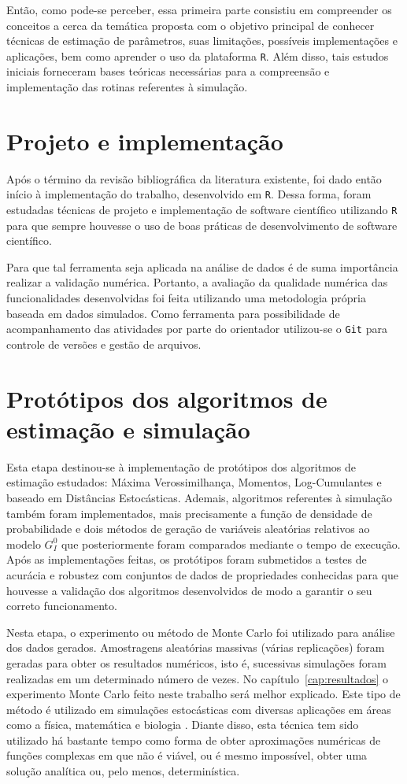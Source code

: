 Então, como pode-se perceber, essa primeira parte consistiu em compreender os conceitos a cerca da temática proposta com o objetivo principal de conhecer técnicas de estimação de parâmetros, suas limitações, possíveis implementações e aplicações, bem como aprender o uso da plataforma \texttt{R}. Além disso, tais estudos iniciais forneceram bases teóricas necessárias para a compreensão e implementação das rotinas referentes à simulação.

\section{Projeto e implementação}

Após o término da revisão bibliográfica da literatura existente, foi dado então início à implementação do trabalho, desenvolvido em \texttt{R}. Dessa forma, foram estudadas técnicas de projeto e implementação de software científico utilizando \texttt{R} para que sempre houvesse o uso de boas práticas de desenvolvimento de software científico.

Para que tal ferramenta seja aplicada na análise de dados é de suma importância realizar a validação numérica. Portanto, a avaliação da qualidade numérica das funcionalidades desenvolvidas foi feita utilizando uma metodologia própria baseada em dados simulados. Como ferramenta para possibilidade de acompanhamento das atividades por parte do orientador utilizou-se o \texttt{Git} para controle de versões e gestão de arquivos.

\section{Protótipos dos algoritmos de estimação e simulação}

Esta etapa destinou-se à implementação de protótipos dos algoritmos de estimação estudados: Máxima Verossimilhança, Momentos, Log-Cumulantes e baseado em Distâncias Estocásticas. Ademais, algoritmos referentes à simulação também foram implementados, mais precisamente a função de densidade de probabilidade e dois métodos de geração de variáveis aleatórias relativos ao modelo $G_I^0$ que posteriormente foram comparados mediante o tempo de execução. Após as implementações feitas, os protótipos foram submetidos a testes de acurácia e robustez com conjuntos de dados de propriedades conhecidas para que houvesse a validação dos algoritmos desenvolvidos de modo a garantir o seu correto funcionamento. 

Nesta etapa, o experimento ou método de Monte Carlo foi utilizado para análise dos dados gerados. Amostragens aleatórias massivas (várias replicações) foram geradas para obter os resultados numéricos, isto é, sucessivas simulações foram realizadas em um determinado número de vezes. 
No capítulo~\ref{cap:resultados} o experimento Monte Carlo feito neste trabalho será melhor explicado. Este tipo de método é utilizado em simulações estocásticas com diversas aplicações em áreas como a física, matemática e biologia \citep{busto92}. Diante disso, esta técnica tem sido utilizado há bastante tempo como forma de obter aproximações numéricas de funções complexas em que não é viável, ou é mesmo impossível, obter uma solução analítica ou, pelo menos, determinística.

